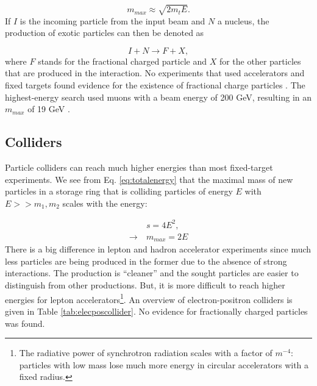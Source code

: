 \begin{equation}
\label{eq:mmax}
m_{max} \approx \sqrt{2 m_t E}.
\end{equation}
If $I$ is the incoming particle from the input beam and $N$ a nucleus, the production of exotic particles can then be denoted as

\begin{equation}
I + N \rightarrow F + X,
\end{equation}
where $F$ stands for the fractional charged particle and $X$ for the other particles that are produced in the interaction. No experiments that used accelerators and fixed targets found evidence for the existence of fractional charge particles \cite{Lyons:1984pw}. The highest-energy search used muons with a beam energy of 200 GeV, resulting in an $m_{max}$ of 19 GeV \cite{Aubert:1983jy}.
\subsection{Colliders}
Particle colliders can reach much higher energies than most fixed-target experiments. We see from Eq. \ref{eq:totalenergy} that the maximal mass of new particles in a storage ring that is colliding particles of energy $E$ with $E>>m_1,m_2$ scales with the energy: 

\begin{equation}
\begin{split}
&s = 4E^2,\\
\rightarrow \ &m_{max} = 2E
\end{split}
\end{equation}
There is a big difference in lepton and hadron accelerator experiments since much less particles are being produced in the former due to the absence of strong interactions. The production is ``cleaner'' and the sought particles are easier to distinguish from other productions. But, it is more difficult to reach higher energies for lepton accelerators\footnote{The radiative power of synchrotron radiation scales with a factor of $m^{-4}$: particles with low mass lose much more energy in circular accelerators with a fixed radius.}. An overview of electron-positron colliders is given in Table \ref{tab:elecposcollider}. No evidence for fractionally charged particles was found.


